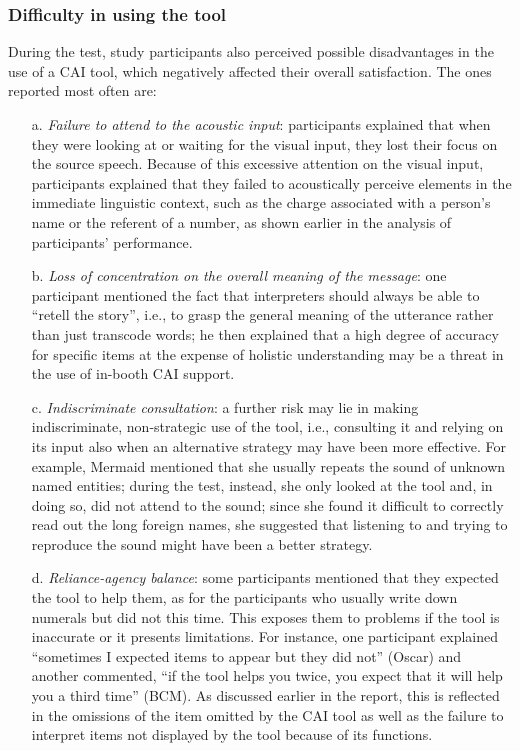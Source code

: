 \subsubsection{Difficulty in using the tool}


During the test, study participants also perceived possible disadvantages in the use of a CAI tool, which negatively affected their overall satisfaction. The ones reported most often are:
\begin{itemize}
    \item [a.] \textit{Failure to attend to the acoustic input}: participants explained that when they were looking at or waiting for the visual input, they lost their focus on the source speech. Because of this excessive attention on the visual input, participants explained that they failed to acoustically perceive elements in the immediate linguistic context, such as the charge associated with a person’s name or the referent of a number, as shown earlier in the analysis of participants’ performance.
\item [b.] \textit{Loss of concentration on the overall meaning of the message}: one participant mentioned the fact that interpreters should always be able to ``retell the story'', i.e., to grasp the general meaning of the utterance rather than just transcode words; he then explained that a high degree of accuracy for specific items at the expense of holistic understanding may be a threat in the use of in-booth CAI support.
\item [c.] \textit{Indiscriminate consultation}: a further risk may lie in making indiscriminate, non-strategic use of the tool, i.e., consulting it and relying on its input also when an alternative strategy may have been more effective. For example, Mermaid mentioned that she usually repeats the sound of unknown named entities; during the test, instead, she only looked at the tool and, in doing so, did not attend to the sound; since she found it difficult to correctly read out the long foreign names, she suggested that listening to and trying to reproduce the sound might have been a better strategy.
\item [d.] \textit{Reliance-agency balance}: some participants mentioned that they expected the tool to help them, as for the participants who usually write down numerals but did not this time. This exposes them to problems if the tool is inaccurate or it presents limitations. For instance, one participant explained ``sometimes I expected items to appear but they did not'' (Oscar) and another commented, ``if the tool helps you twice, you expect that it will help you a third time'' (BCM). As discussed earlier in the report, this is reflected in the omissions of the item omitted by the CAI tool as well as the failure to interpret items not displayed by the tool because of its functions.
\end{itemize}












